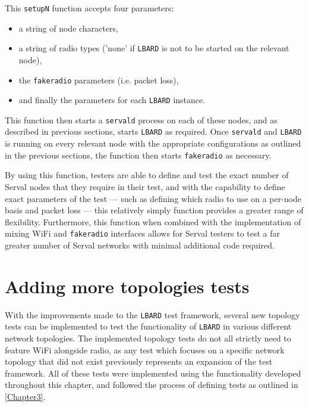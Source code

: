 This \texttt{setupN} function accepts four parameters:
\begin{itemize}
    \item a string of node characters, 
    \item a string of radio types ('none' if \texttt{LBARD} is not to be started on the relevant node), 
    \item the \texttt{fakeradio} parameters (i.e. packet loss), 
    \item and finally the parameters for each \texttt{LBARD} instance.
\end{itemize}

This function then starts a \texttt{servald} process on each of these nodes, and as described in previous sections, starts \texttt{LBARD} as required.
Once \texttt{servald} and \texttt{LBARD} is running on every relevant node with the appropriate configurations as outlined in the previous sections, the function then starts \texttt{fakeradio} as necessary.

By using this function, testers are able to define and test the exact number of Serval nodes that they require in their test, and with the capability to define exact parameters of the test — such as defining which radio to use on a per-node basis and packet loss — this relatively simply function provides a greater range of flexibility.
Furthermore, this function when combined with the implementation of mixing WiFi and \texttt{fakeradio} interfaces allows for Serval testers to test a far greater number of Serval networks with minimal additional code required.


\section{Adding more topologies tests}
With the improvements made to the \texttt{LBARD} test framework, several new topology tests can be implemented to test the functionality of \texttt{LBARD} in various different network topologies.
The implemented topology tests do not all strictly need to feature WiFi alongside radio, as any test which focuses on a specific network topology that did not exist previously represents an expansion of the test framework.
All of these tests were implemented using the functionality developed throughout this chapter, and followed the process of defining tests as outlined in \chaptername{ \ref{Chapter3}}.


